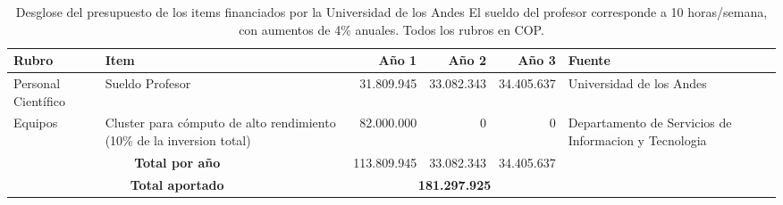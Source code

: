 \begin{table}[h]
\begin{center}
\begin{tabular}{|l|p{3.0cm}|r|r|r|p{2.5cm}|}\hline
{\bf Rubro}	&{\bf Item}	& {\bf Año 1}	& {\bf Año 2}	& {\bf Año 3}	& {\bf Fuente}\\	\hline
Personal Científico	&Sueldo Profesor	&31.809.945	&33.082.343	&34.405.637	&Universidad de los Andes\\	\hline
Equipos	&Cluster para c\'omputo de alto rendimiento (10\% de la inversion total)	&82.000.000	&0	&0	&Departamento de Servicios de Informacion y Tecnologia\\\hline
\multicolumn{2}{|c|}{{\bf Total por año}}&	113.809.945	&33.082.343	&34.405.637&\\\hline
\multicolumn{2}{|c|}{{\bf Total aportado}}&	 \multicolumn{3}{|c|}{{\bf 181.297.925}}&\\\hline 
\end{tabular} 
\caption{Desglose del presupuesto de los items financiados por la Universidad de los Andes
 El sueldo del profesor corresponde a 10 horas/semana, con aumentos de 4\% anuales. Todos los rubros en COP. }
\end{center}
\label{Resumen Presupuesto Colciencias}
\end{table}

%
